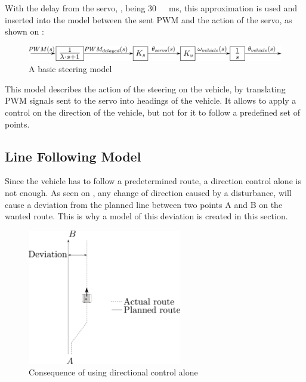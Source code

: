 With the delay from the servo, \si{\lambda}, being \si{30\ ms}, this approximation is used and inserted into the model between the sent PWM and the action of the servo, as shown on :
\begin{figure}[H]
	\centering
	\includegraphics[width=\textwidth]{figures/basicSteeringModelWithDelay.pdf}
	\caption{A basic steering model}
	\label{basicSteeringWithDelay}
\end{figure}
%
This model describes the action of the steering on the vehicle, by translating PWM signals sent to the servo into headings of the vehicle. It allows to apply a control on the direction of the vehicle, but not for it to follow a predefined set of points.

\subsection{Line Following Model}
Since the vehicle has to follow a predetermined route, a direction control alone is not enough. As seen on , any change of direction caused by a disturbance, will cause a deviation from the planned line between two points A and B on the wanted route. This is why a model of this deviation is created in this section.

\begin{figure}[H]
	\centering
	\includegraphics[width=0.6\textwidth]{figures/steeringDeviation.pdf}
	\caption{Consequence of using directional control alone}
	\label{SteeringDeviation}
\end{figure}

